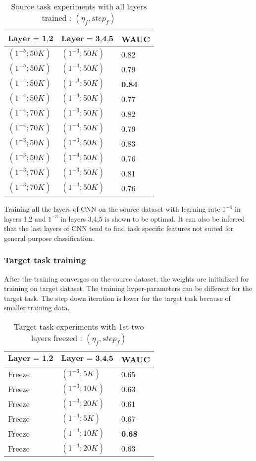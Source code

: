 \begin{table}[!htb]
\centering
\begin{tabular}{| p{} | p{}| p{}| }
\hline
$\textbf{Layer = 1,2}$ & $\textbf{Layer = 3,4,5}$ & \textbf{WAUC}\\
\hline
$(1^{-5}; 50K)$ & $(1^{-3}; 50K)$ & 0.82\\
\hline
$(1^{-5}; 50K)$ & $(1^{-4}; 50K)$ & 0.79\\
\hline
$(1^{-4}; 50K)$ & $(1^{-3}; 50K)$ & \textbf{0.84}\\
\hline
$(1^{-4}; 50K)$ & $(1^{-4}; 50K)$ & 0.77\\
\hline
$(1^{-4}; 70K)$ & $(1^{-3}; 50K)$ & 0.82\\
\hline
$(1^{-4}; 70K)$ & $(1^{-4}; 50K)$ & 0.79\\
\hline
$(1^{-3}; 50K)$ & $(1^{-3}; 50K)$ & 0.83\\
\hline
$(1^{-3}; 50K)$ & $(1^{-4}; 50K)$ & 0.76\\
\hline
$(1^{-3}; 70K)$ & $(1^{-3}; 50K)$ & 0.81\\
\hline
$(1^{-3}; 70K)$ & $(1^{-4}; 50K)$ & 0.76\\
\hline
\end{tabular}
\caption{Source task experiments with all layers trained : $(\eta_{f}, {step}_{f})$}\label{tab:a6}
\end{table}
\FloatBarrier
\noindent Training all the layers of CNN on the source dataset with learning rate $1^{-4}$ in layers 1,2 and $1^{-3}$ in layers 3,4,5 is shown to be optimal. It can also be inferred that the last layers of CNN tend to find task specific features not suited for general purpose classification. 
 
\subsubsection{Target task training}
After the training converges on the source dataset, the weights are initialized for training on target dataset. The training hyper-parameters can be different for the target task. The step down iteration is lower for the target task because of smaller training data. 
\begin{table}[!htb]
\centering
\begin{tabular}{| p{} | p{}| p{}| }
\hline
$\textbf{Layer = 1,2}$ & $\textbf{Layer = 3,4,5}$ & \textbf{WAUC}\\
\hline
Freeze & $(1^{-3}; 5K)$ & 0.65\\
\hline
Freeze & $(1^{-3}; 10K)$ & 0.63\\
\hline
Freeze & $(1^{-3}; 20K)$ & 0.61\\
\hline
Freeze & $(1^{-4}; 5K)$ & 0.67\\
\hline
Freeze & $(1^{-4}; 10K)$ & \textbf{0.68}\\
\hline
Freeze & $(1^{-4}; 20K)$ & 0.63\\
\hline
\end{tabular}
\caption{Target task experiments with 1st two layers freezed : $(\eta_{f}, {step}_{f})$}\label{tab:a7} 
\end{table}

